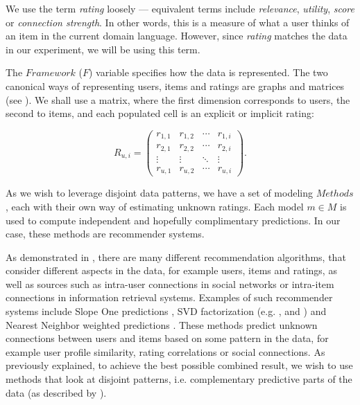 We use the term \emph{rating} loosely --- equivalent terms include \emph{relevance}, \emph{utility},
\emph{score} or \emph{connection strength}. In other words, this is a measure of what a user thinks of an item
in the current domain language. However, since \emph{rating} 
matches the data in our experiment, we will be using this term.

The $Framework$ ($F$) variable specifies how the data is represented.
The two canonical ways of representing users, items and ratings are graphs and matrices 
(see \cite{Mirza2003}).
We shall use a matrix, where the first dimension corresponds to users, the second to items, and each populated cell is an explicit or implicit rating:

\begin{equation*}
 R_{u,i} =
 \begin{pmatrix}
  r_{1,1} & r_{1,2} & \cdots & r_{1,i} \\
  r_{2,1} & r_{2,2} & \cdots & r_{2,i} \\
  \vdots  & \vdots  & \ddots & \vdots  \\
  r_{u,1} & r_{u,2} & \cdots & r_{u,i}
 \end{pmatrix}.
\end{equation*}

As we wish to leverage disjoint data patterns, we have a set of modeling $Methods$, 
each with their own way of estimating unknown ratings. 
Each model $m \in M$ is used to compute independent and hopefully complimentary predictions.
In our case, these methods are recommender systems.

As demonstrated in 
\cite{Adomavicius2005, Pazzani2007, Schafer2007, Segaran2007},
there are many different recommendation algorithms,
that consider different aspects in the data, for example users, items and ratings, as well as 
sources such as intra-user connections in social networks or intra-item connections in information retrieval systems.
Examples of such recommender systems include Slope One predictions \cite{Lemire2005}, 
SVD factorization (e.g. \cite[p5]{Billsus}, \cite{Sun2005} and \cite{Bell2007}) and 
Nearest Neighbor weighted predictions \cite[p11]{Segaran2007}.
These methods predict unknown connections between users and items based on some pattern in the data,
for example user profile similarity, rating correlations or social connections.
As previously explained, to achieve the best possible combined result, we wish to use methods that look at disjoint patterns, 
i.e. complementary predictive parts of the data
(as described by \cite[p1]{Bell2007b}).

